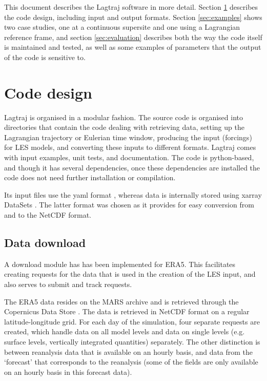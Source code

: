\documentclass[a4paper,11pt]{article}
\begin{document}
This document describes the Lagtraj software in more detail. Section
\ref{sec:design} describes the code design, including input and output
formats. Section \ref{sec:examples} shows two case studies, one at a
continuous supersite and one using a Lagrangian reference frame, and
section \ref{sec:evaluation} describes both the way the code itself is
maintained and tested, as well as some examples of parameters that the
output of the code is sensitive to.

\section{Code design}\label{sec:design}

Lagtraj is organised in a modular fashion. The source code is organised
into directories that contain the code dealing with retrieving data,
setting up the Lagrangian trajectory or Eulerian time window, producing
the input (forcings) for LES models, and converting these inputs to
different formats. Lagtraj comes with input examples, unit tests, and
documentation. The code is python-based, and though it has several
dependencies, once these dependencies are installed the code does not
need further installation or compilation.

Its input files use the yaml format \citep{ben2009}, whereas data is
internally stored using xarray DataSets \citep{hoyer2017}. The latter
format was chosen as it provides for easy conversion from and to the
NetCDF format.

\subsection{Data download}

A download module has has been implemented for ERA5. This facilitates
creating requests for the data that is used in the creation of the LES
input, and also serves to submit and track requests.

The ERA5 data resides on the MARS archive and is retrieved through the
Copernicus Data Store \citep{raoult2017}. The data is retrieved in NetCDF format on a
regular latitude-longitude grid. For each day of the simulation, four
separate requests are created, which handle data on all model levels
and data on single levels (e.g. surface levels, vertically integrated
quantities) separately. The other distinction is between reanalysis
data that is available on an hourly basis, and data from the `forecast'
that corresponds to the reanalysis (some of the fields are only
available on an hourly basis in this forecast data).
\end{document}
